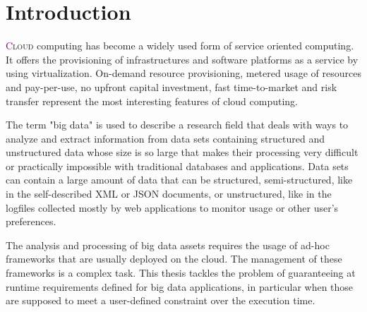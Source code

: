 \chapter{Introduction} \label{chap:Introduction}

\lettrine[lines=4]{\textcolor{purple}{C}}{loud} computing has become a widely used form of service oriented computing. It offers the provisioning of infrastructures and software platforms as a service by using virtualization.  On-demand resource provisioning, metered usage of resources and pay-per-use, no upfront capital investment, fast time-to-market and risk transfer represent the most interesting features of cloud computing.

The term "big data" is used to describe a research field that deals with ways to analyze and extract information from data sets containing structured and unstructured data whose size is so large that makes their processing very difficult or practically impossible with traditional databases and applications. Data sets can contain a large amount of data that can be structured, semi-structured, like in the self-described XML or JSON documents, or unstructured, like in the logfiles collected mostly by web applications to monitor usage or other user's preferences.

The analysis and processing of big data assets requires the usage of ad-hoc frameworks that are usually deployed on the cloud. The management of these frameworks is a complex task. This thesis tackles the problem of guaranteeing at runtime \qos requirements defined for big data applications, in particular when those are supposed to meet a user-defined constraint over the execution time.
   
